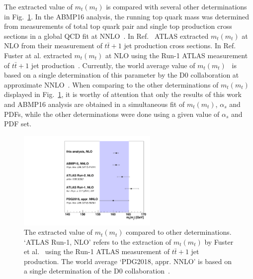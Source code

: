 \documentclass[12pt,a4paper]{article}
\newcommand{\msbarm}[1][]{\ensuremath{m_{#1}(m_{#1})}\xspace}
\begin{document}
The extracted value of $\msbarm[t]$ is compared with several other determinations in Fig.~\ref{fig:mtmt}.
In the ABMP16 analysis, the running top quark mass was determined from measurements of total top quark pair and single top production cross sections in a global QCD fit at NNLO~\cite{Alekhin:2017kpj}. In Ref.~\cite{Aad:2019mkw} ATLAS extracted \msbarm[t] at NLO from their measurement of $t\bar{t}+1$ jet production cross sections. In Ref.~\cite{Fuster:2017rev} Fuster at al. extracted \msbarm[t] at NLO using the Run-1 ATLAS measurement of $t\bar{t}+1$ jet production~\cite{Aad:2015waa}. Currently, the world average value of \msbarm[t]~\cite{Tanabashi:2018oca} is based on a single determination of this parameter by the D0 collaboration at approximate NNLO~\cite{Abazov:2011pta}. When comparing to the other determinations of $\msbarm[t]$ displayed in Fig.~\ref{fig:mtmt}, it is worthy of attention that only the results of this work and ABMP16 analysis are obtained in a simultaneous fit of $\msbarm[t]$, $\alpha_s$ and PDFs, while the other determinations were done using a given value of $\alpha_s$ and PDF set.

\begin{figure}
    \centering
    \includegraphics[width=0.6\textwidth]{figs/mtmt.pdf}
    \caption{The extracted value of $\msbarm[t]$ compared to other determinations. `ATLAS Run-1, NLO' refers to the extraction of \msbarm[t] by Fuster et al.~\cite{Fuster:2017rev} using the Run-1 ATLAS measurement of $t\bar{t}+1$ jet production. The world average `PDG2018, appr. NNLO' is based on a single determination of the D0 collaboration~\cite{Abazov:2011pta}.}
    \label{fig:mtmt}
\end{figure}
\end{document}
